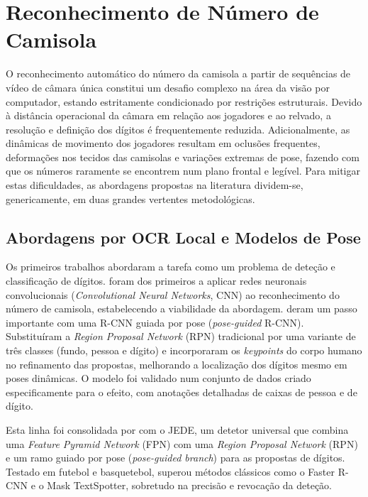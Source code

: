 \section{Reconhecimento de Número de Camisola}

O reconhecimento automático do número da camisola a partir de sequências de vídeo de câmara
única constitui um desafio complexo na área da visão por computador, estando estritamente
condicionado por restrições estruturais. Devido à distância operacional da câmara em
relação aos jogadores e ao relvado, a resolução e definição dos dígitos é frequentemente
reduzida. Adicionalmente, as dinâmicas de movimento dos jogadores resultam em oclusões
frequentes, deformações nos tecidos das camisolas e variações extremas de pose, fazendo
com que os números raramente se encontrem num plano frontal e legível. Para mitigar estas
dificuldades, as abordagens propostas na literatura dividem-se, genericamente, em duas
grandes vertentes metodológicas.

\subsection{Abordagens por OCR Local e Modelos de Pose}

Os primeiros trabalhos abordaram a tarefa como um problema de deteção e classificação
de dígitos. \citet{gerke2015soccer} foram dos primeiros a aplicar redes neuronais
convolucionais (\emph{Convolutional Neural Networks}, CNN) ao reconhecimento do número
de camisola, estabelecendo a viabilidade da abordagem. \citet{liu2019poseguided} deram
um passo importante com uma R-CNN guiada por pose (\emph{pose-guided} R-CNN). Substituíram
a \emph{Region Proposal Network} (RPN) tradicional por uma variante de três classes
(fundo, pessoa e dígito) e incorporaram os \emph{keypoints} do corpo humano no
refinamento das propostas, melhorando a localização dos dígitos mesmo em poses
dinâmicas. O modelo foi validado num conjunto de dados criado especificamente para o
efeito, com anotações detalhadas de caixas de pessoa e de dígito.

Esta linha foi consolidada por \citet{liu2022jede} com o JEDE, um detetor universal que
combina uma \emph{Feature Pyramid Network} (FPN) com uma \emph{Region Proposal Network}
(RPN) e um ramo guiado por pose (\emph{pose-guided branch}) para as propostas de dígitos.
Testado em futebol e basquetebol, superou métodos clássicos como o Faster R-CNN e o Mask
TextSpotter, sobretudo na precisão e revocação da deteção.

